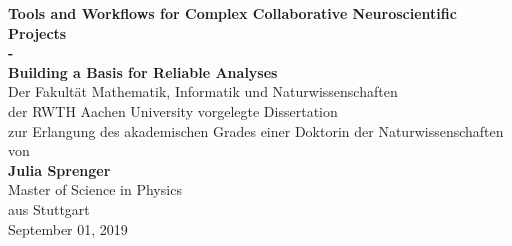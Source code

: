 \documentclass[
    pdftex,
    fontsize=11pt,
    a4paper
   ]{scrbook}
\renewcommand{\title}{Tools and Workflows for Complex Collaborative Neuroscientific Projects\\-\\Building a Basis for Reliable Analyses}
\newcommand{\thesisdate}{September 01, 2019}
\newcommand{\thesisauthor}{Julia Sprenger}
\newcommand{\authorbirthplace}{Stuttgart}
\newcommand{\authordegree}{Master of Science in Physics}
\begin{document}
\begin{titlepage}
    \begin{center}
        \vspace*{1cm}
        \Large
        \textbf{\title}\\
        \vspace{3.5cm}
        \large
        Der Fakultät Mathematik, Informatik und Naturwissenschaften\\
        der RWTH Aachen University vorgelegte Dissertation\\
        zur Erlangung des akademischen Grades einer Doktorin der Naturwissenschaften\\
        \vspace{2cm}
        von\\
        \large{\textbf{\thesisauthor{}}}\\
        \normalsize
        \authordegree\\
        \vspace{0.5cm}
        aus \authorbirthplace\\
        \vspace{2cm}
        \large
        \thesisdate
    \end{center}
\end{titlepage}
\end{document}
